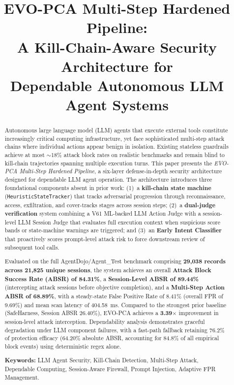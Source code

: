 \documentclass[conference]{IEEEtran}
\begin{document}
\title{EVO-PCA Multi-Step Hardened Pipeline:\\A Kill-Chain-Aware Security Architecture for\\Dependable Autonomous LLM Agent Systems}

\author{}

\maketitle

\begin{abstract}
Autonomous large language model (LLM) agents that execute external tools constitute increasingly critical computing infrastructure, yet face sophisticated multi-step attack chains where individual actions appear benign in isolation. Existing stateless guardrails achieve at most $\sim$18\% attack block rates on realistic benchmarks and remain blind to kill-chain trajectories spanning multiple execution turns. This paper presents the \textit{EVO-PCA Multi-Step Hardened Pipeline}, a six-layer defense-in-depth security architecture designed for dependable LLM agent operation. The architecture introduces three foundational components absent in prior work: (1)~a \textbf{kill-chain state machine} (\texttt{HeuristicStateTracker}) that tracks adversarial progression through reconnaissance, access, exfiltration, and cover-tracks stages across session steps; (2)~a \textbf{dual-judge verification} system combining a V61 ML-backed LLM Action Judge with a session-level LLM Session Judge that evaluates full execution context when suspicious score bands or state-machine warnings are triggered; and (3)~an \textbf{Early Intent Classifier} that proactively scores prompt-level attack risk to force downstream review of subsequent tool calls.

Evaluated on the full AgentDojo/Agent\_Test benchmark comprising \textbf{29,038 records across 21,825 unique sessions}, the system achieves an overall \textbf{Attack Block Success Rate (ABSR) of 84.31\%}, a \textbf{Session-Level ABSR of 89.44\%} (intercepting attack sessions before objective completion), and a \textbf{Multi-Step Action ABSR of 68.89\%}, with a steady-state False Positive Rate of 8.41\% (overall FPR of 9.69\%) and mean scan latency of 404.58~ms. Compared to the strongest prior baseline (SafeHarness, Session ABSR 26.40\%), EVO-PCA achieves a \textbf{3.39$\times$} improvement in session-level attack interception. Dependability analysis demonstrates graceful degradation under LLM component failures, with a fast-path fallback retaining 76.2\% of protection efficacy (64.20\% absolute ABSR, accounting for 84.8\% of all empirical block events) using deterministic regex alone.

\textbf{Keywords:} LLM Agent Security, Kill-Chain Detection, Multi-Step Attack, Dependable Computing, Session-Aware Firewall, Prompt Injection, Adaptive FPR Management.
\end{abstract}
\end{document}

